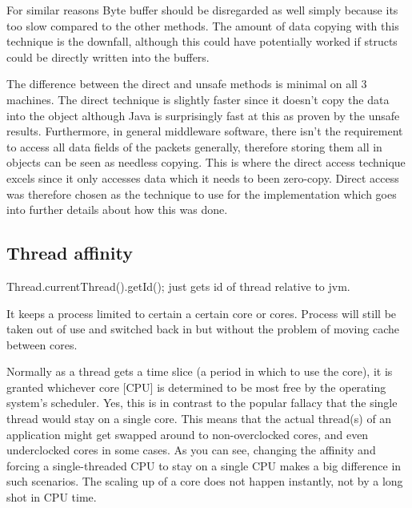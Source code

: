 \documentclass[final_report.tex]{subfiles}
\begin{document}
For similar reasons Byte buffer should be disregarded as well simply because its too slow compared to the other methods. The amount of data copying with this technique is the downfall, although this could have potentially worked if structs could be directly written into the buffers. 

The difference between the direct and unsafe methods is minimal on all 3 machines. The direct technique is slightly faster since it doesn't copy the data into the object although Java is surprisingly fast at this as proven by the unsafe results. Furthermore, in general middleware software, there isn't the requirement to access all data fields of the packets generally, therefore storing them all in objects can be seen as needless copying. This is where the direct access technique excels since it only accesses data which it needs to been zero-copy. Direct access was therefore chosen as the technique to use for the implementation which goes into further details about how this was done.



\subsection{Thread affinity}
Thread.currentThread().getId(); just gets id of thread relative to jvm.

It keeps a process limited to certain a certain core or cores. Process will still be taken out of use and switched back in but without the problem of moving cache between cores.

Normally as a thread gets a time slice (a period in which to use the core), it is granted whichever core [CPU] is determined to be most free by the operating system's scheduler. Yes, this is in contrast to the popular fallacy that the single thread would stay on a single core. This means that the actual thread(s) of an application might get swapped around to non-overclocked cores, and even underclocked cores in some cases. As you can see, changing the affinity and forcing a single-threaded CPU to stay on a single CPU makes a big difference in such scenarios. The scaling up of a core does not happen instantly, not by a long shot in CPU time.
\end{document}
